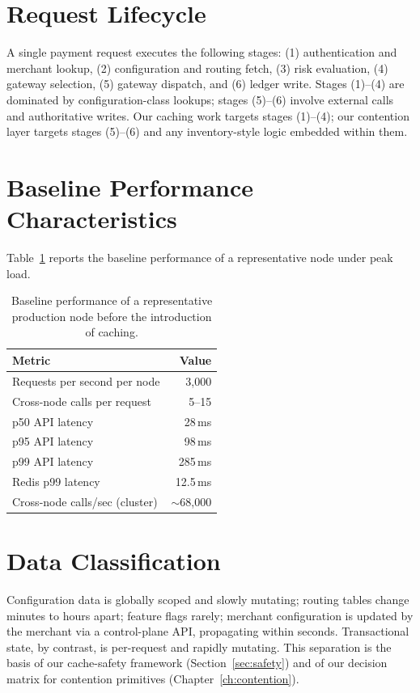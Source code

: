 \documentclass[12pt,a4paper,oneside]{report}
\begin{document}
\section{Request Lifecycle}
A single payment request executes the following stages: (1) authentication and merchant lookup, (2) configuration and routing fetch, (3) risk evaluation, (4) gateway selection, (5) gateway dispatch, and (6) ledger write. Stages (1)--(4) are dominated by configuration-class lookups; stages (5)--(6) involve external calls and authoritative writes. Our caching work targets stages (1)--(4); our contention layer targets stages (5)--(6) and any inventory-style logic embedded within them.

\section[Baseline Performance]{Baseline Performance Characteristics}
Table~\ref{tab:baseline} reports the baseline performance of a representative node under peak load.

\begin{table}[h]
\centering
\begin{tabular}{lr}
\toprule
\textbf{Metric} & \textbf{Value} \\
\midrule
Requests per second per node      & 3{,}000  \\
Cross-node calls per request      & 5--15    \\
p50 API latency                   & 28\,ms   \\
p95 API latency                   & 98\,ms   \\
p99 API latency                   & 285\,ms  \\
Redis p99 latency                 & 12.5\,ms \\
Cross-node calls/sec (cluster)    & $\sim$68{,}000 \\
\bottomrule
\end{tabular}
\caption{Baseline performance of a representative production node before the introduction of caching.}
\label{tab:baseline}
\end{table}

\section{Data Classification}
Configuration data is globally scoped and slowly mutating; routing tables change minutes to hours apart; feature flags rarely; merchant configuration is updated by the merchant via a control-plane API, propagating within seconds. Transactional state, by contrast, is per-request and rapidly mutating. This separation is the basis of our cache-safety framework (Section~\ref{sec:safety}) and of our decision matrix for contention primitives (Chapter~\ref{ch:contention}).
\end{document}
